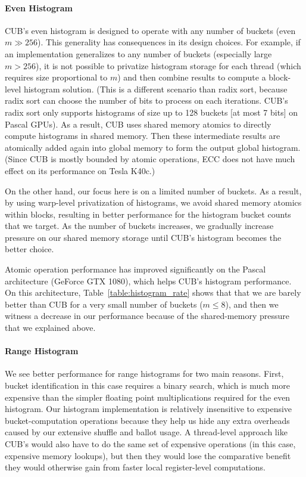 

\paragraph{Even Histogram}
CUB's even histogram  is designed to operate with any number of buckets (even $m\gg256$).
This generality has consequences in its design choices.
For example, if an implementation generalizes to any number of buckets (especially large $m>256$), it is not possible to privatize histogram storage for each thread (which requires size proportional to $m$) and then combine  results to compute a block-level histogram solution.
(This is a different scenario than radix sort, because radix sort can choose the number of bits to process on each iterations. CUB's radix sort only supports histograms of size up to 128 buckets [at most 7 bits] on Pascal GPUs).
As a result, CUB uses shared memory atomics to directly compute histograms in shared memory.
Then these intermediate results are atomically added again into global memory to form the output global histogram. (Since CUB is mostly bounded by atomic operations, ECC does not have much effect on its performance on Tesla K40c.)

On the other hand, our focus here is on a limited number of buckets.
As a result, by using warp-level privatization of histograms, we avoid shared memory atomics within blocks, resulting in better performance for the histogram bucket counts that we target.
As the number of buckets increases, we gradually increase pressure on our shared memory storage until CUB's histogram becomes the better choice.

Atomic operation performance has improved significantly on the Pascal architecture (GeForce GTX 1080), which helps CUB's histogram performance. On this architecture, Table~\ref{table:histogram_rate} shows that that we are barely better than CUB for a very small number of buckets ($m\leq 8$), and then we witness a decrease in our performance because of the shared-memory pressure that we explained above.

\paragraph{Range Histogram}
We see better performance for range histograms for two main reasons.
First, bucket identification in this case requires a binary search, which is much more expensive than the simpler floating point multiplications required for the even histogram.
Our histogram implementation is relatively insensitive to expensive bucket-computation operations because they help us hide any extra overheads caused by our extensive shuffle and ballot usage. A thread-level approach like CUB's would also have to do the same set of expensive operations (in this case, expensive memory lookups), but then they would lose the comparative benefit they would otherwise gain from faster local register-level computations.

